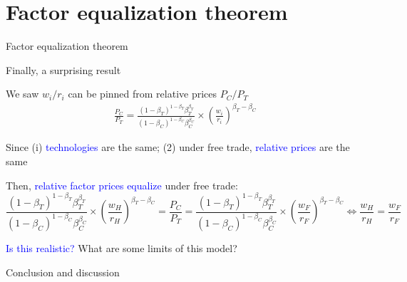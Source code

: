 \documentclass[notes,11pt, aspectratio=169, xcolor=table]{beamer}
\newcommand{\blue}[1]{\textcolor{blue}{#1}}
\newenvironment{wideitemize}{\itemize\addtolength{\itemsep}{10pt}}{\enditemize}
\begin{document}
\section{Factor equalization theorem}

\begin{frame}{Factor equalization theorem}
\begin{wideitemize}
    \item Finally, a surprising result
    \item<2-> We saw $w_i/r_i$ can be pinned from relative prices $P_C/P_T$
    \begin{eqnarray*}\label{eq: goods-factor-prices}
    \frac{P_C}{P_T} = \frac{(1-\beta_T)^{1-\beta_T} \beta_T^{\beta_T}}{ (1-\beta_C)^{1-\beta_C} \beta_C^{\beta_C} } \times \left(  \frac{w_i}{r_i} \right)^{\beta_T - \beta_C}
\end{eqnarray*} 

    \item<3-> Since (i) \blue{technologies} are the same; (2) under free trade, \blue{relative prices} are the same

    \item<4-> Then, \blue{relative factor prices equalize} under free trade:
    { \scriptsize
    \begin{equation*}
    \frac{(1-\beta_T)^{1-\beta_T} \beta_T^{\beta_T}}{ (1-\beta_C)^{1-\beta_C} \beta_C^{\beta_C} } \times \left(  \frac{w_H}{r_H} \right)^{\beta_T - \beta_C} = \frac{P_C}{P_T} = \frac{(1-\beta_T)^{1-\beta_T} \beta_T^{\beta_T}}{ (1-\beta_C)^{1-\beta_C} \beta_C^{\beta_C} } \times \left(  \frac{w_F}{r_F} \right)^{\beta_T - \beta_C} \iff \frac{w_H}{r_H} = \frac{w_F}{r_F}
    \end{equation*}
    }

    \item<5-> \blue{Is this realistic?} What are some limits of this model?


\end{wideitemize}
     
\end{frame}

\begin{frame}{Conclusion and discussion}
    
\end{frame}
\end{document}
